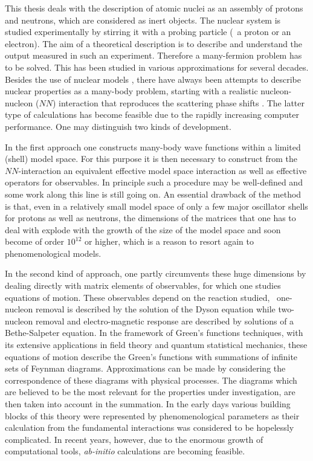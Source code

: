 This thesis deals with the description of atomic nuclei as an assembly of 
protons and neutrons, which are considered as inert objects. 
The nuclear system is studied experimentally by stirring it with a probing 
particle (\eg\ a proton or an electron). The aim of a theoretical description is
to describe and understand the output measured in such an experiment. 
Therefore a many-fermion problem has to be solved.
This has been studied in various approximations for several decades.
Besides the use of nuclear models%
\cite{DeT63,EG72,dSF74,BM75,BG77,RS80}, 
there have always been attempts to describe nuclear 
properties as a many-body problem, starting with a realistic nucleon-nucleon 
($NN$) interaction that reproduces the scattering phase shifts 
\cite{KB66,KB68,BK73,MMB90,FM94}. 
The latter type of calculations has become feasible due to the 
rapidly increasing computer performance. One may distinguish two kinds of 
development. 

In the first approach one constructs many-body wave functions within a limited 
(shell) model space. For this purpose it is then necessary to construct from 
the $NN$-interaction an equivalent effective model space interaction as well 
as effective operators for observables. In principle such a procedure may be 
well-defined\cite{Br67a,BJB71,MPK85} 
and some work along this line is still going on\cite{SOE94}. 
An essential drawback of the method is that, even in a relatively
small model space of only a few major oscillator shells for protons as well as
neutrons, the dimensions of the matrices that one has to deal with explode 
with the growth of 
the size of the model space and soon become of order $10^{12}$ or higher,
which is a reason to resort again to phenomenological models\cite{Ta92}.

In the second kind of approach, one partly circumvents these huge dimensions by 
dealing directly with matrix elements of observables, for which one studies 
equations of motion. 
These observables depend on the reaction studied, \eg\ one-nucleon removal is 
described by the solution of the Dyson equation while two-nucleon removal and 
electro-magnetic response are described by solutions of a Bethe-Salpeter 
equation.
In the framework of Green's functions techniques, 
with its extensive applications in field theory and quantum statistical 
mechanics\cite{AGD63,FW71,KE88},
these equations of motion describe the Green's functions with summations of 
infinite sets of Feynman diagrams.
Approximations can be made by considering the correspondence of these diagrams
with physical processes.
The diagrams which are believed to be the most relevant for the 
properties under investigation,
are then taken into account in the summation.
 In the early days various building blocks of 
this theory were represented by phenomenological parameters\cite{Mi67} as 
their calculation from the fundamental interactions was considered to be 
hopelessly complicated. In recent years, however, due to the enormous growth of 
computational tools, {\em ab-initio} calculations are becoming feasible. 


